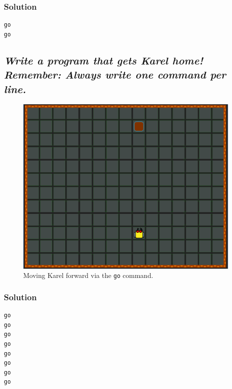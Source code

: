\documentclass[article,A4,12pt]{llncs}
\begin{document}
\subsubsection*{Solution}
\begin{verbatim}
go
go
\end{verbatim}

\newpage

\subsection
{\em Write a program that gets Karel home! Remember: Always write one command per line.}

\begin{figure}[!ht]
\begin{center}
\includegraphics[height=0.4\textwidth]{imgk/a17.png}
\end{center}
\vspace{-4mm}
\caption{Moving Karel forward via the {\tt go} command.}
\label{fig:b02}
\vspace{-4mm}
\end{figure}
\noindent

\subsubsection{Solution}
\begin{verbatim}
go
go
go
go
go
go
go
go
\end{verbatim}
\subsection{}
\end{document}
